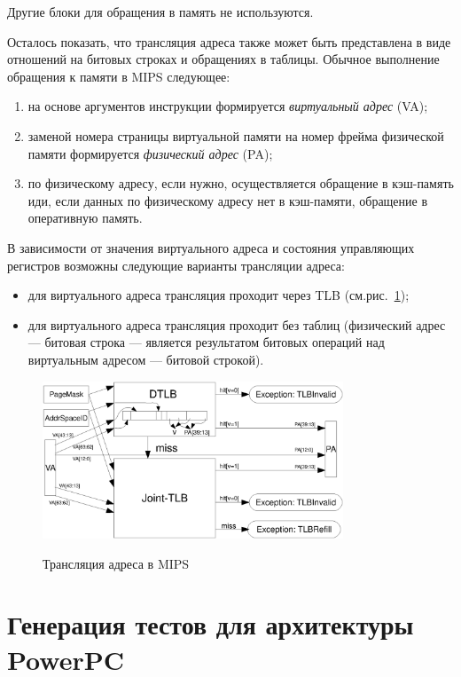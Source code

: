 \documentclass[14pt]{extreport}
\begin{document}
Другие блоки для обращения в память не используются.

Осталось показать, что трансляция адреса также может быть представлена в виде
отношений на битовых строках и обращениях в таблицы. Обычное выполнение
обращения к памяти в MIPS следующее:
\begin{enumerate}
    \item на основе аргументов инструкции формируется \emph{виртуальный адрес}
(VA);
    \item заменой номера страницы виртуальной памяти на номер фрейма физической
памяти формируется \emph{физический адрес} (PA);
    \item по физическому адресу, если нужно, осуществляется обращение в
кэш-память иди, если данных по физическому адресу нет в кэш-памяти, обращение в
оперативную память.
\end{enumerate}

В зависимости от значения виртуального адреса и состояния управляющих регистров
возможны следующие варианты трансляции адреса:
\begin{itemize}
  \item для виртуального адреса трансляция проходит через TLB
(см.рис.~\ref{fig:mips_address_translation});
  \item для виртуального адреса трансляция проходит без таблиц (физический адрес
--- битовая строка --- является результатом битовых операций над виртуальным
адресом --- битовой строкой).
\end{itemize}

\begin{figure}[h] \center
  \includegraphics[width=0.8\textwidth]{4.analysis/mips_addrtrans}\\
  \caption{Трансляция адреса в MIPS}\label{fig:mips_address_translation}
\end{figure}

\section{Генерация тестов для архитектуры PowerPC}
\end{document}
